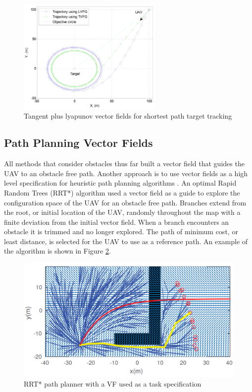 \documentclass[numbered,pdftex]{ohio-etd}
\begin{document}
\begin{figure}
	\centering
	\includegraphics[width=7cm]{PaperFigures/lyapunovChen}
	\caption{Tangent plus lyapunov vector fields for shortest path target tracking \cite{chen_uav_2013}}
	\label{fig:lyapunovChen}
\end{figure}


\subsection{Path Planning Vector Fields}
All methods that consider obstacles thus far built a vector field that guides the UAV to an obstacle free path. Another approach is to use vector fields as a high level specification for heuristic path planning algorithms \cite{pereira_framework_2016}. An optimal Rapid Random Trees (RRT*) algorithm used a vector field as a guide to explore the configuration space of the UAV for an obstacle free path. Branches extend from the root, or initial location of the UAV, randomly throughout the map with a finite deviation from the initial vector field. When a branch encounters an obstacle it is trimmed and no longer explored. The path of minimum cost, or least distance, is selected for the UAV to use as a reference path. An example of the algorithm is shown in Figure \ref{fig:rrtvf}.

\begin{figure}
	\centering
	\includegraphics[width=12cm]{PaperFigures/rrtVF}
	\caption{RRT* path planner with a VF used as a task specification \cite{pereira_framework_2016}}
	\label{fig:rrtvf}
\end{figure}
\end{document}
